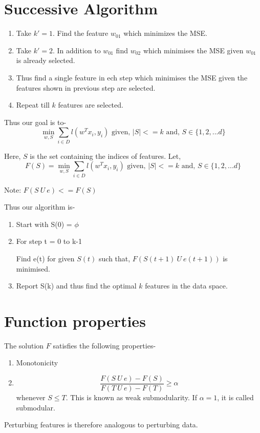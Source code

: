 \documentclass[11pt, twosides]{article}
\begin{document}
\section{Successive Algorithm}
\begin{enumerate}
    \item Take $k' = 1$. Find the feature $w_{01}$ which minimizes the MSE.
    \item Take $k' = 2$. In addition to $w_{01}$ find $w_{02}$ which minimises the MSE given $w_{01}$ is already selected.
    \item Thus find a single feature in ech step which minimises the MSE given the features shown in previous step are selected.
    \item Repeat till $k$ features are selected.
\end{enumerate}

Thus our goal is to-
$$ \min_{w, S} \sum_{i\in D} l(w^Tx_i, y_i) \text{ \ \ \ given, \ \ \ } |S|<=k \text{ \ and, \ } S\in \{1,2,...d\}$$


Here, $S$ is the set containing the indices of features.
Let,
$$F(S) = \min_{w, S} \sum_{i\in D} l(w^Tx_i, y_i) \text{ \ \ \ given, \ \ \ } |S|<=k \text{ \ and, \ } S\in \{1,2,...d\}$$

Note: $F(S \ U \ e) <= F(S)$

Thus our algorithm is-
\begin{enumerate}
    \item Start with S(0) = $\phi$
    \item For step t = 0 to k-1
    \begin{enumerate}
         Find e(t) for given $S(t)$ such that, $F(S(t+1) \ U \ e(t+1))$ is minimised.
    \end{enumerate}
    \item Report S(k) and thus find the optimal $k$ features in the data space.
\end{enumerate}
\section{Function properties}
The solution $F$ satisfies the following properties-
\begin{enumerate}
    \item Monotonicity
    \item $$\frac{F(S \ U \ e) - F(S)}{F(T \ U \ e) - F(T)} \geq \alpha$$ whenever $S \leq T$. This is known as weak submodularity. If $\alpha = 1$, it is called submodular.
\end{enumerate}
Perturbing features is therefore analogous to perturbing data.
\end{document}
